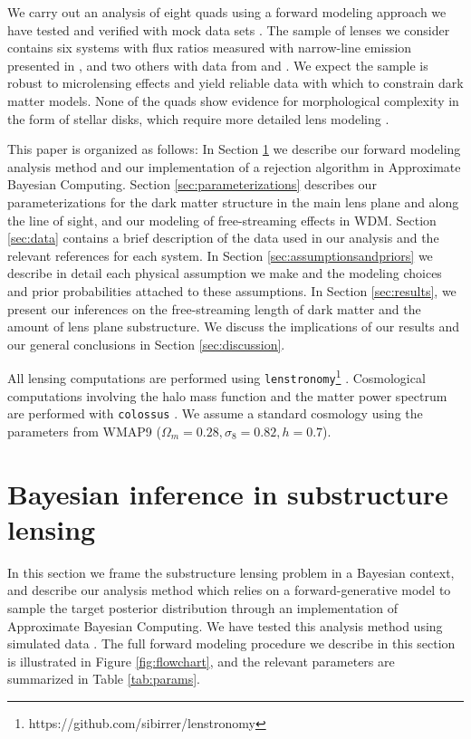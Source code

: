 We carry out an analysis of eight quads using a forward modeling approach we have tested and verified with mock data sets \citep{Gilman++18,Gilman++19}. The sample of lenses we consider contains six systems with flux ratios measured with narrow-line emission presented in \citet{Nierenberg++19}, and two others with data from \citet{Nierenberg++14} and \citet{Nierenberg++17}. We expect the sample is robust to microlensing effects and yield reliable data with which to constrain dark matter models. None of the quads show evidence for morphological complexity in the form of stellar disks, which require more detailed lens modeling \citep{Hsueh++16,Gilman++17,Hsueh++17}. 

This paper is organized as follows: In Section \ref{sec:inference} we describe our forward modeling analysis method and our implementation of a rejection algorithm in Approximate Bayesian Computing. Section \ref{sec:parameterizations} describes our parameterizations for the dark matter structure in the main lens plane and along the line of sight, and our modeling of free-streaming effects in WDM. Section \ref{sec:data} contains a brief description of the data used in our analysis and the relevant references for each system. In Section \ref{sec:assumptionsandpriors} we describe in detail each physical assumption we make and the modeling choices and prior probabilities attached to these assumptions. In Section \ref{sec:results}, we present our inferences on the free-streaming length of dark matter and the amount of lens plane substructure. We discuss the implications of our results and our general conclusions in Section \ref{sec:discussion}. 

All lensing computations are performed using {\tt{lenstronomy}}\footnote{https://github.com/sibirrer/lenstronomy} \citep{BirrerAmara18}. Cosmological computations involving the halo mass function and the matter power spectrum are performed with {\tt{colossus}} \citep{Diemer17}. We assume a standard cosmology using the parameters from WMAP9 \citep{WMAP9cosmo} ($\Omega_m = 0.28, \sigma_8 = 0.82, h=0.7$).  

\section{Bayesian inference in substructure lensing}
\label{sec:inference}
In this section we frame the substructure lensing problem in a Bayesian context, and describe our analysis method which relies on a forward-generative model to sample the target posterior distribution through an implementation of Approximate Bayesian Computing. We have tested this analysis method using simulated data \citep{Gilman++18,Gilman++19}. The full forward modeling procedure we describe in this section is illustrated in Figure \ref{fig:flowchart}, and the relevant parameters are summarized in Table \ref{tab:params}. 

